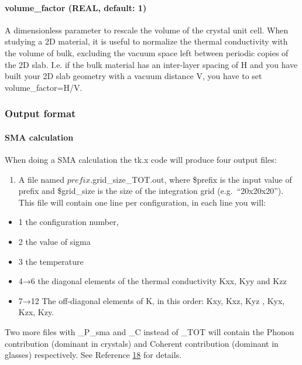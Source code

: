 \documentclass[
]{article}
\providecommand{\tightlist}{%
  \setlength{\itemsep}{0pt}\setlength{\parskip}{0pt}}
\begin{document}
\hypertarget{volume_factor-real-default-1}{%
\paragraph{volume\_factor (REAL, default:
1)}\label{volume_factor-real-default-1}}

A dimensionless parameter to rescale the volume of the crystal unit
cell. When studying a 2D material, it is useful to normalize the thermal
conductivity with the volume of bulk, excluding the vacuum space left
between periodic copies of the 2D slab. I.e. if the bulk material has an
inter-layer spacing of H and you have built your 2D slab geometry with a
vacuum distance V, you have to set volume\_factor=H/V.

\hypertarget{output-format-3}{%
\subsubsection{Output format}\label{output-format-3}}

\hypertarget{sma-calculation}{%
\paragraph{SMA calculation}\label{sma-calculation}}

When doing a SMA calculation the tk.x code will produce four output
files:

\begin{enumerate}
\def\labelenumi{\arabic{enumi}.}
\tightlist
\item
  A file named \(prefix.\)grid\_size\_TOT.out, where \$prefix is the
  input value of prefix and \$grid\_size is the size of the integration
  grid (e.g.~\enquote{20x20x20}). This file will contain one line per
  configuration, in each line you will:
\end{enumerate}

\begin{itemize}
\tightlist
\item
  1 the configuration number,
\item
  2 the value of sigma
\item
  3 the temperature
\item
  4→6 the diagonal elements of the thermal conductivity Kxx, Kyy and Kzz
\item
  7→12 The off-diagonal elements of K, in this order: Kxy, Kxz, Kyz ,
  Kyx, Kzx, Kzy.
\end{itemize}

Two more files with \_P\_sma and \_C instead of \_TOT will contain the
Phonon contribution (dominant in crystals) and Coherent contribution
(dominant in glasses) respectively. See Reference
\protect\hyperlink{ref18}{18} for details.
\end{document}
